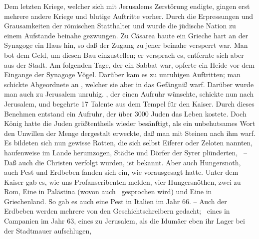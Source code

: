 \begin{aufza}
\begin{aufzb}
\item Dem letzten Kriege, welcher sich mit Jerusalems Zerstörung endigte, gingen erst mehrere andere Kriege und blutige Auftritte vorher. Durch die Erpressungen und Grausamkeiten der römischen Statthalter  und  wurde die jüdische Nation zu einem Aufstande beinahe gezwungen. Zu Cäsarea baute ein Grieche hart an der Synagoge ein Haus hin, so daß der Zugang zu jener beinahe versperrt war. Man bot dem  Geld, um diesen Bau einzustellen; er versprach es, entfernte sich aber aus der Stadt. Am folgenden Tage, der ein Sabbat war, opferte ein Heide vor dem Eingange der Synagoge Vögel. Darüber kam es zu unruhigen Auftritten; man schickte Abgeordnete an , welcher sie aber in das Gefängniß warf. Darüber wurde man auch zu Jerusalem unruhig. , der einen Aufruhr wünschte, schickte nun nach Jerusalem, und begehrte 17 Talente aus dem Tempel für den Kaiser. Durch dieses Benehmen entstand ein Aufruhr, der über 3000 Juden das Leben kostete. Doch König  hatte die Juden größtentheils wieder besänftigt, als ein unbehutsames Wort den Unwillen der Menge dergestalt erweckte, daß man mit Steinen nach ihm warf. Es bildeten sich nun gewisse Rotten, die sich selbst Eiferer oder Zeloten nannten, haufenweise im Lande herumzogen, Städte und Dörfer der Syrer plünderten, \usw\ -- Daß auch die Christen verfolgt wurden, ist bekannt. Aber auch Hungersnoth, auch Pest und Erdbeben fanden sich ein, wie  vorausgesagt hatte. Unter dem Kaiser  gab es, wie uns Profanscribenten melden, vier Hungersnöthen, zwei zu Rom, Eine in Palästina (wovon auch \ gesprochen wird) und Eine in Griechenland. So gab es auch eine Pest in Italien im Jahr 66. -- Auch der Erdbeben werden mehrere von den Geschichtschreibern gedacht; \zB\ eines in Campanien im Jahr 63, eines zu Jerusalem, als die Idumäer eben ihr Lager bei der Stadtmauer aufschlugen, \usw

\end{aufzb}
\end{aufza}
